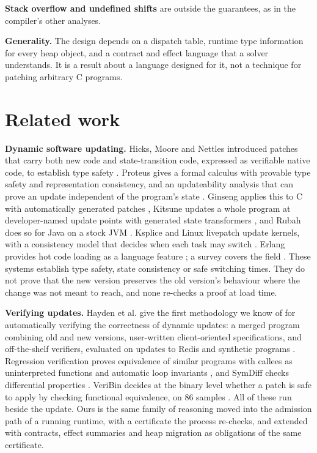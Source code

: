 \documentclass[10pt,twocolumn]{article}
\begin{document}
\textbf{Stack overflow and undefined shifts} are outside the guarantees, as in the compiler's other analyses.

\textbf{Generality.} The design depends on a dispatch table, runtime type information for every heap object, and a contract and effect language that a solver understands. It is a result about a language designed for it, not a technique for patching arbitrary C programs.

\section{Related work}\label{sec-related}
\textbf{Dynamic software updating.} Hicks, Moore and Nettles introduced patches that carry both new code and state-transition code, expressed as verifiable native code, to establish type safety \cite{hicks2001dsu}. Proteus gives a formal calculus with provable type safety and representation consistency, and an updateability analysis that can prove an update independent of the program's state \cite{stoyle2005proteus}. Ginseng applies this to C with automatically generated patches \cite{neamtiu2006ginseng}, Kitsune updates a whole program at developer-named update points with generated state transformers \cite{hayden2012kitsune}, and Rubah does so for Java on a stock JVM \cite{pina2014rubah}. Ksplice and Linux livepatch update kernels, with a consistency model that decides when each task may switch \cite{arnold2009ksplice,livepatch}. Erlang provides hot code loading as a language feature \cite{armstrong2003erlang}; a survey covers the field \cite{survey2022patching}. These systems establish type safety, state consistency or safe switching times. They do not prove that the new version preserves the old version's behaviour where the change was not meant to reach, and none re-checks a proof at load time.

\textbf{Verifying updates.} Hayden et al. give the first methodology we know of for automatically verifying the correctness of dynamic updates: a merged program combining old and new versions, user-written client-oriented specifications, and off-the-shelf verifiers, evaluated on updates to Redis and synthetic programs \cite{hayden2012correctness}. Regression verification proves equivalence of similar programs with callees as uninterpreted functions and automatic loop invariants \cite{godlin2013regression}, and SymDiff checks differential properties \cite{lahiri2012symdiff}. VeriBin decides at the binary level whether a patch is safe to apply by checking functional equivalence, on 86 samples \cite{wu2025veribin}. All of these run beside the update. Ours is the same family of reasoning moved into the admission path of a running runtime, with a certificate the process re-checks, and extended with contracts, effect summaries and heap migration as obligations of the same certificate.
\end{document}
